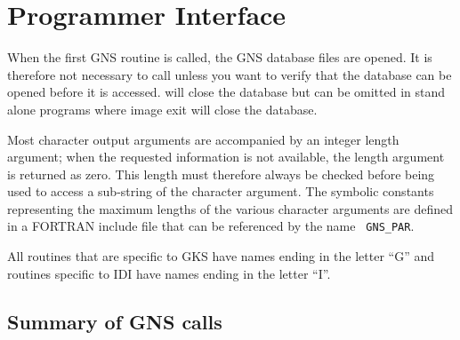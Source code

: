 \newpage
\section{Programmer Interface}\label{prog}

When the first GNS routine is called, the GNS database files are opened. It is
therefore not necessary to call 
 unless you want to verify that
the database can be opened before it is accessed. 
 will close
the database but can be omitted in stand alone programs where image exit will
close the database.

Most character output arguments are accompanied by an integer length argument;
when the requested information is not available, the length argument is
returned as zero. This length must therefore always be checked before being
used to access a sub-string of the character argument. The symbolic constants
representing the maximum lengths of the various character arguments are defined 
in a FORTRAN include file that can be referenced by the name {\tt
GNS\_PAR}.

All routines that are specific to GKS have names ending in the letter ``G'' and
routines specific to IDI have names ending in the letter ``I''.

\subsection{Summary of GNS calls}

